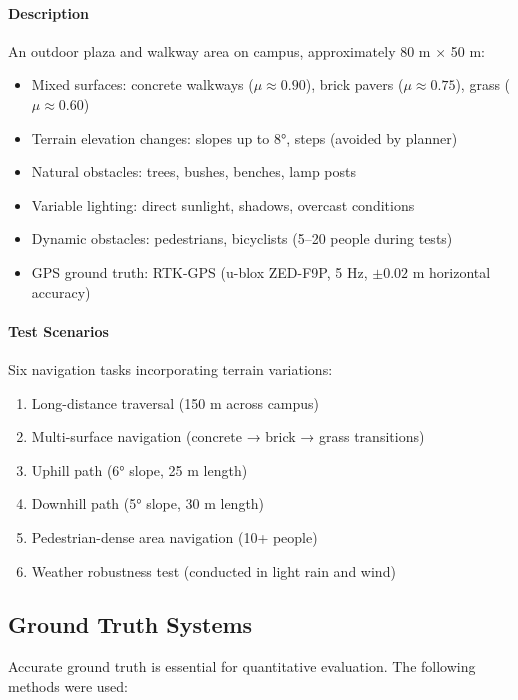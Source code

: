 \paragraph{Description}
An outdoor plaza and walkway area on campus, approximately 80 m × 50 m:
\begin{itemize}
    \item Mixed surfaces: concrete walkways ($\mu \approx 0.90$), brick pavers ($\mu \approx 0.75$), grass ($\mu \approx 0.60$)
    \item Terrain elevation changes: slopes up to 8°, steps (avoided by planner)
    \item Natural obstacles: trees, bushes, benches, lamp posts
    \item Variable lighting: direct sunlight, shadows, overcast conditions
    \item Dynamic obstacles: pedestrians, bicyclists (5--20 people during tests)
    \item GPS ground truth: RTK-GPS (u-blox ZED-F9P, 5 Hz, $\pm 0.02$ m horizontal accuracy)
\end{itemize}


\paragraph{Test Scenarios}
Six navigation tasks incorporating terrain variations:
\begin{enumerate}
    \item Long-distance traversal (150 m across campus)
    \item Multi-surface navigation (concrete → brick → grass transitions)
    \item Uphill path (6° slope, 25 m length)
    \item Downhill path (5° slope, 30 m length)
    \item Pedestrian-dense area navigation (10+ people)
    \item Weather robustness test (conducted in light rain and wind)
\end{enumerate}

\subsection{Ground Truth Systems}

Accurate ground truth is essential for quantitative evaluation. The following methods were used:

